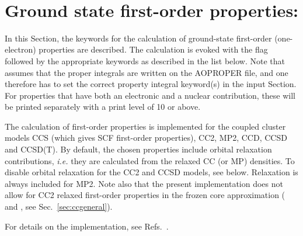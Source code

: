 ~%
\section{Ground state first-order properties: }
\label{sec:ccfop}

In this Section, the keywords for the calculation of ground-state first-order
(one-electron) properties are described. The calculation
is evoked with the  flag followed by the appropriate
keywords as described in the list below. Note that 
assumes that the proper integrals are written on the
AOPROPER file, and one therefore has to set the correct property
integral keyword(s) in the  input Section. For properties
that have both an electronic and a nuclear contribution, these will
be printed separately with a print level of 10 or above.

The calculation of first-order properties is implemented for the 
coupled cluster models CCS (which gives SCF first-order properties),
CC2, MP2, CCD,  CCSD and CCSD(T).  
By default, the chosen properties include orbital relaxation
contributions,
{\it i.e.\/} they are calculated from the relaxed CC (or MP) densities. 
To disable orbital relaxation for the CC2 and CCSD models, 
see  below. Relaxation is always included for MP2. 
Note also that the present implementation does not allow for 
CC2 relaxed first-order
properties in the frozen core approximation 
( and , see Sec.~\ref{sec:ccgeneral}).

For details on the implementation, see 
Refs.~\cite{Halkier:CCFOP,Halkier:CC2RLXFOP,Hald:CCPTFOP}.

\begin{center}
\end{center}

